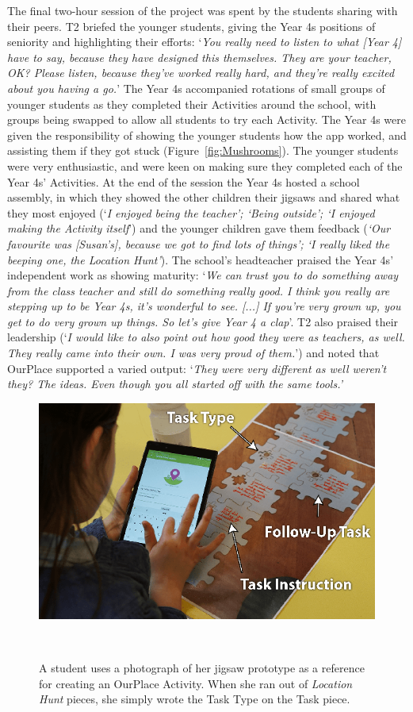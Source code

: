 The final two-hour session of the project was spent by the students sharing with their peers. T2 briefed the younger students, giving the Year 4s positions of seniority and highlighting their efforts: `\textit{You really need to listen to what [Year 4] have to say, because they have designed this themselves. They are your teacher, OK? Please listen, because they've worked really hard, and they're really excited about you having a go.}' The Year 4s accompanied rotations of small groups of younger students as they completed their Activities around the school, with groups being swapped to allow all students to try each Activity. The Year 4s were given the responsibility of showing the younger students how the app worked, and assisting them if they got stuck (Figure~\ref{fig:Mushrooms}). The younger students were very enthusiastic, and were keen on making sure they completed each of the Year 4s' Activities. At the end of the session the Year 4s hosted a school assembly, in which they showed the other children their jigsaws and shared what they most enjoyed (`\textit{I enjoyed being the teacher'; `Being outside'; `I enjoyed making the Activity itself}') and the younger children gave them feedback (\textit{`Our favourite was [Susan's], because we got to find lots of things'; `I really liked the beeping one, the Location Hunt'}). The school's headteacher praised the Year 4s' independent work as showing maturity: `\textit{We can trust you to do something away from the class teacher and still do something really good. I think you really are stepping up to be Year 4s, it's wonderful to see. [...] If you're very grown up, you get to do very grown up things. So let's give Year 4 a clap}'. T2 also praised their leadership (`\textit{I would like to also point out how good they were as teachers, as well. They really came into their own. I was very proud of them.}') and noted that OurPlace supported a varied output: `\textit{They were very different as well weren't they? The ideas. Even though you all started off with the same tools.'}

\begin{figure}
\centering
  \includegraphics[width=0.7\columnwidth]{images/chapter08/jigsawToApp}
  \caption[A student referring to her paper prototype]{A student uses a photograph of her jigsaw prototype as a reference for creating an OurPlace Activity. When she ran out of \textit{Location Hunt} pieces, she simply wrote the Task Type on the Task piece.}~\label{fig:JigsawToApp}
\end{figure}

